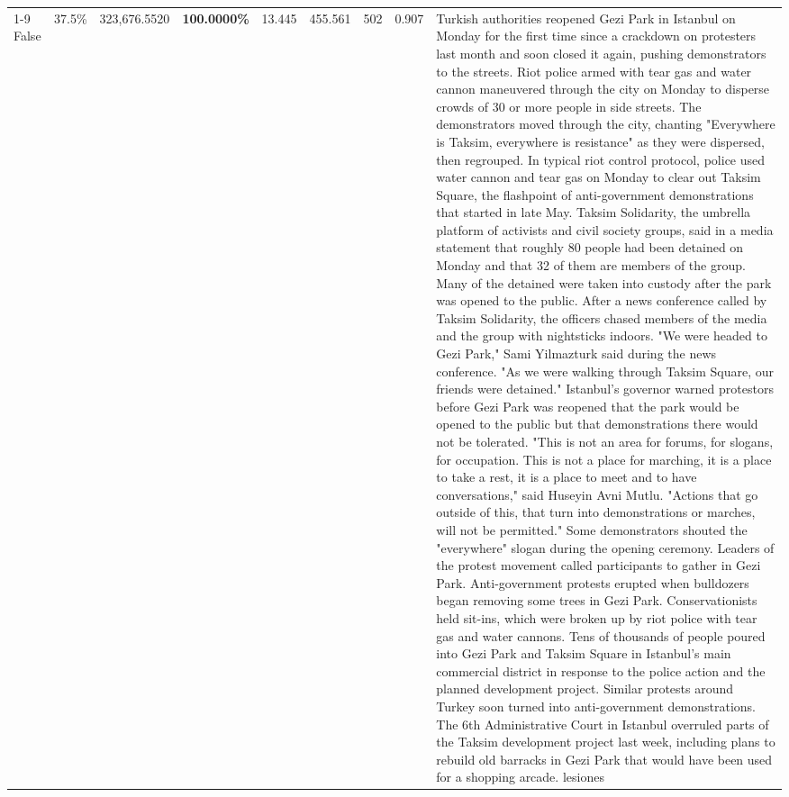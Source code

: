 \begin{table}[H]
\begin{tabular}{lllrlllll}
\cline{1-9}
False & 37.5\% & 323,676.5520 & \bfseries \color{red} 100.0000\% & 13.445 & 455.561 & 502 & 0.907 & Turkish authorities reopened Gezi Park in Istanbul on Monday for the first time since a crackdown on protesters last month and soon closed it again, pushing demonstrators to the streets. Riot police armed with tear gas and water cannon maneuvered through the city on Monday to disperse crowds of 30 or more people in side streets. The demonstrators moved through the city, chanting "Everywhere is Taksim, everywhere is resistance" as they were dispersed, then regrouped. In typical riot control protocol, police used water cannon and tear gas on Monday to clear out Taksim Square, the flashpoint of anti-government demonstrations that started in late May. Taksim Solidarity, the umbrella platform of activists and civil society groups, said in a media statement that roughly 80 people had been detained on Monday and that 32 of them are members of the group. Many of the detained were taken into custody after the park was opened to the public. After a news conference called by Taksim Solidarity, the officers chased members of the media and the group with nightsticks indoors. "We were headed to Gezi Park," Sami Yilmazturk said during the news conference. "As we were walking through Taksim Square, our friends were detained." Istanbul's governor warned protestors before Gezi Park was reopened that the park would be opened to the public but that demonstrations there would not be tolerated. "This is not an area for forums, for slogans, for occupation. This is not a place for marching, it is a place to take a rest, it is a place to meet and to have conversations," said Huseyin Avni Mutlu. "Actions that go outside of this, that turn into demonstrations or marches, will not be permitted." Some demonstrators shouted the "everywhere" slogan during the opening ceremony. Leaders of the protest movement called participants to gather in Gezi Park. Anti-government protests erupted when bulldozers began removing some trees in Gezi Park. Conservationists held sit-ins, which were broken up by riot police with tear gas and water cannons. Tens of thousands of people poured into Gezi Park and Taksim Square in Istanbul's main commercial district in response to the police action and the planned development project. Similar protests around Turkey soon turned into anti-government demonstrations. The 6th Administrative Court in Istanbul overruled parts of the Taksim development project last week, including plans to rebuild old barracks in Gezi Park that would have been used for a shopping arcade. lesiones \\

\end{tabular}
\end{table}
